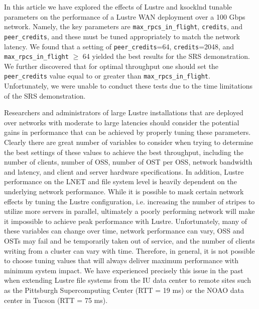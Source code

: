 \documentclass[]{sigplan-proc}
\begin{document}
In this article we have explored the effects of Lustre and ksocklnd tunable parameters on the performance of a
Lustre WAN deployment over a 100 Gbps network. Namely, the key parameters are {\tt max\_rpcs\_in\_flight},
{\tt credits}, and {\tt peer\_credits}, and these must be tuned appropriately to match the network latency. We
found that a setting of {\tt peer\_credits}=64, {\tt credits}=2048, and {\tt max\_rpcs\_in\_flight} $\geq$ 64
yielded the best results for the SRS demonstration. We further discovered that for optimal throughput one
should set the {\tt peer\_credits} value equal to or greater than {\tt max\_rpcs\_in\_flight}. Unfortunately,
we were unable to conduct these tests due to the time limitations of the SRS demonstration.

Researchers and administrators of large Lustre installations that are deployed over networks with moderate to
large latencies should consider the potential gains in performance that can be achieved by properly tuning
these parameters. Clearly there are great number of variables to consider when trying to determine the best
settings of these values to achieve the best throughput, including the number of clients, number of OSS,
number of OST per OSS, network bandwidth and latency, and client and server hardware specifications. In
addition, Lustre performance on the LNET and file system level is heavily dependent on the underlying network
performance. While it is possible to mask certain network effects by tuning the Lustre configuration,
i.e. increasing the number of stripes to utilize more servers in parallel, ultimately a poorly performing
network will make it impossible to achieve peak performance with Lustre. Unfortunately, many of these
variables can change over time, network performance can vary, OSS and OSTs may fail and be temporarily taken
out of service, and the number of clients writing from a cluster can vary with time. Therefore, in general, it
is not possible to choose tuning values that will always deliver maximum performance with minimum system
impact. We have experienced precisely this issue in the past when extending Lustre file systems from the IU
data center to remote sites such as the Pittsburgh Supercomputing Center (RTT = 19 ms) or the NOAO data
center in Tucson (RTT = 75 ms).
\end{document}

